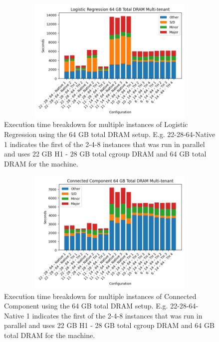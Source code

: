 \begin{figure}[ht!]
        \includegraphics[width=13cm,height=6cm]{./fig/logr64.png}
    \caption{Execution time breakdown for multiple instances of
    Logistic Regression using the 64 GB total DRAM setup. E.g.
    22-28-64-Native 1 indicates the first of the 2-4-8 instances that
    was run in parallel and uses 22 GB H1 - 28 GB total cgroup DRAM
    and 64 GB total DRAM for the machine.}
	\label{fig:logr64}
\end{figure}

\begin{figure}[ht!]
        \includegraphics[width=13cm,height=6cm]{./fig/cc64.png}
    \caption{Execution time breakdown for multiple instances of
    Connected Component using the 64 GB total DRAM setup. E.g.
    22-28-64-Native 1 indicates the first of the 2-4-8 instances that
    was run in parallel and uses 22 GB H1 - 28 GB total cgroup DRAM
    and 64 GB total DRAM for the machine.}
	\label{fig:cc64}
\end{figure}

